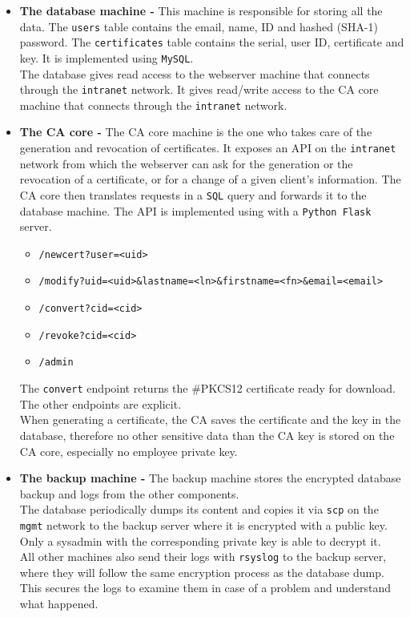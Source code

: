 \documentclass[english]{article}
\begin{document}
\begin{itemize}
	\item \textbf{The database machine -} This machine is responsible for storing all the data. The \texttt{users} table contains the email, name, ID and hashed (SHA-1) password. The \texttt{certificates} table contains the serial, user ID, certificate and key. It is implemented using \texttt{MySQL}. \\
    The database gives read access to the webserver machine that connects through the \texttt{intranet} network. It gives read/write access to the CA core machine that connects through the \texttt{intranet} network.
  \item \textbf{The CA core - } The CA core machine is the one who takes care of the generation and revocation of certificates. It exposes an API on the \texttt{intranet} network from which the webserver can ask for the generation or the revocation of a certificate, or for a change of a given client's information. The CA core then translates requests in a \texttt{SQL} query and forwards it to the database machine. The API is implemented using with a \texttt{Python Flask} server.
    \begin{itemize}
      \item \texttt{/newcert?user=<uid>}
      \item \texttt{/modify?uid=<uid>\&lastname=<ln>\&firstname=<fn>\&email=<email>}
      \item \texttt{/convert?cid=<cid>}
      \item \texttt{/revoke?cid=<cid>}
      \item \texttt{/admin}
    \end{itemize}
    The \texttt{convert} endpoint returns the \#PKCS12 certificate ready for download. The other endpoints are explicit.\\
    When generating a certificate, the CA saves the certificate and the key in the database, therefore no other sensitive data than the CA key is stored on the CA core, especially no employee private key.
	\item \textbf{The backup machine -} The backup machine stores the encrypted database backup and logs from the other components.\\
    The database periodically dumps its content and copies it via \texttt{scp} on the \texttt{mgmt} network to the backup server where it is encrypted with a public key. Only a sysadmin with the corresponding private key is able to decrypt it.\\
    All other machines also send their logs with \texttt{rsyslog} to the backup server, where they will follow the same encryption process as the database dump. This secures the logs to examine them in case of a problem and understand what happened.\\
\end{itemize}
\end{document}
